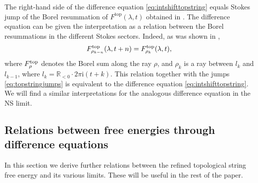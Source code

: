 \documentclass[pdftex]{sigma}
\numberwithin{equation}{section}
\begin{document}
\begin{Remark}
The right-hand side of the difference equation \eqref{eq:intshifttopstring} equals Stokes jump of the Borel resummation of $F^\textrm{top}(\lambda,t)$ obtained in \cite{ASTT21}. The difference equation can be given the interpretation as a relation between the Borel resummations in the different Stokes sectors. Indeed, as was shown in \cite[Corollary~3.12]{ASTT21},
\begin{equation*}
 F^{\rm top}_{{\rho}_{k-n}} (\lambda,t+n)=F_{\rho_k}^{\rm top} (\lambda,t),
\end{equation*}
where $F_{\rho}^{\rm top}$ denotes the Borel sum along the ray $\rho$, and $\rho_k$ is a ray between $l_k$ and $l_{k-1}$, where $l_k=\mathbb{R}_{<0}\cdot 2\pi \mathrm{i} (t+k)$. This relation together with the jumps \eqref{eq:topstringjumps} is equivalent to the difference equation \eqref{eq:intshifttopstring}. We will find a similar interpretations for the analogous difference equation in the NS limit.
\end{Remark}


\subsection{Relations between free energies through difference equations}\label{sec:relfreeenergies}

In this section we derive further relations between the refined topological string free energy and its various limits. These will be useful in the rest of the paper.
\end{document}
